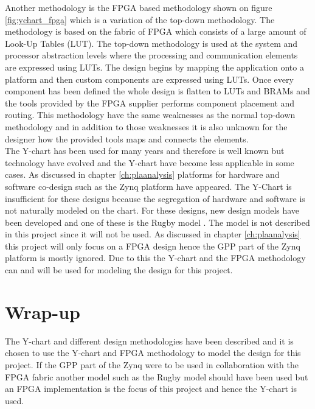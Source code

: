 Another methodology is the FPGA based methodology shown on figure \vref{fig:ychart_fpga} which is a variation of the top-down methodology. The methodology is based on the fabric of FPGA which consists of a large amount of Look-Up Tables (LUT). The top-down methodology is used at the system and processor abstraction levels where the processing and communication elements are expressed using LUTs. The design begins by mapping the application onto a platform and then custom components are expressed using LUTs. Once every component has been defined the whole design is flatten to LUTs and BRAMs and the tools provided by the FPGA supplier performs component placement and routing. This methodology have the same weaknesses as the normal top-down methodology and in addition to those weaknesses it is also unknown for the designer how the provided tools maps and connects the elements.\\

The Y-chart has been used for many years and therefore is well known but technology have evolved and the Y-chart have become less applicable in some cases. As discussed in chapter \ref{ch:plaanalysis} platforms for hardware and software co-design such as the Zynq platform have appeared. The Y-Chart is insufficient for these designs because the segregation of hardware and software is not naturally modeled on the chart. For these designs, new design models have been developed and one of these is the Rugby model \cite{jantsch1999rugby}. The model is not described in this project since it will not be used. As discussed in chapter \ref{ch:plaanalysis} this project will only focus on a FPGA design hence the GPP part of the Zynq platform is mostly ignored. Due to this the Y-chart and the FPGA methodology can and will be used for modeling the design for this project.

\section{Wrap-up}
The Y-chart and different design methodologies have been described and it is chosen to use the Y-chart and FPGA methodology to model the design for this project. If the GPP part of the Zynq were to be used in collaboration with the FPGA fabric another model such as the Rugby model should have been used but an FPGA implementation is the focus of this project and hence the Y-chart is used.

